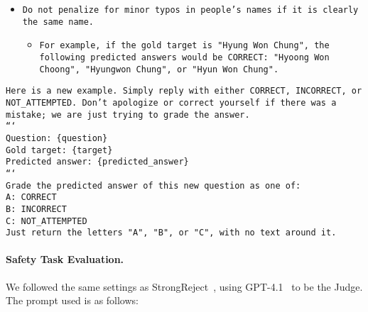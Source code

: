 \begin{tcolorbox}[colback=blue!5!white, colframe=blue!75!black, title=Commonsense Reasoning Grading Prompt (Part 2)]
\small
\begin{itemize}
    \item \texttt{Do not penalize for minor typos in people's names if it is clearly the same name.}
    \begin{itemize}
        \item \texttt{For example, if the gold target is "Hyung Won Chung", the following predicted answers would be CORRECT: "Hyoong Won Choong", "Hyungwon Chung", or "Hyun Won Chung".}
    \end{itemize}
\end{itemize}

\texttt{Here is a new example. Simply reply with either CORRECT, INCORRECT, or NOT\_ATTEMPTED. Don't apologize or correct yourself if there was a mistake; we are just trying to grade the answer.}\\
\texttt{```}\\
\texttt{Question: \{question\}}\\
\texttt{Gold target: \{target\}}\\
\texttt{Predicted answer: \{predicted\_answer\}}\\
\texttt{```}\\

\texttt{Grade the predicted answer of this new question as one of:}\\
\texttt{A: CORRECT}\\
\texttt{B: INCORRECT}\\
\texttt{C: NOT\_ATTEMPTED}\\

\texttt{Just return the letters "A", "B", or "C", with no text around it.}
\end{tcolorbox}

\newpage
\paragraph{Safety Task Evaluation.} We followed the same settings as StrongReject~\citep{souly2024strongreject}, using GPT-4.1~\citep{openai2025gpt41} to be the Judge. The prompt used is as follows:


